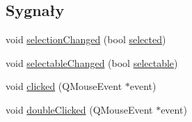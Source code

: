 \subsection*{Sygnały}
\begin{DoxyCompactItemize}
\item 
void \hyperlink{class_q_c_p_text_element_a49f45b87ee9c1fe866c2cdd12af17a9a}{selection\+Changed} (bool \hyperlink{class_q_c_p_text_element_a81f68f4628a7e3c4bd22dbcce09740c5}{selected})
\item 
void \hyperlink{class_q_c_p_text_element_ac4567260b52d02bfbad63357d13986c5}{selectable\+Changed} (bool \hyperlink{class_q_c_p_text_element_ad6f36a709b85638a0e2c005efa4b1049}{selectable})
\item 
void \hyperlink{class_q_c_p_text_element_ad2246a0e701c0655623f048737298334}{clicked} (Q\+Mouse\+Event $\ast$event)
\item 
void \hyperlink{class_q_c_p_text_element_a9c6fd27ae8a7c3a02df7a6bbd3509e40}{double\+Clicked} (Q\+Mouse\+Event $\ast$event)
\end{DoxyCompactItemize}
